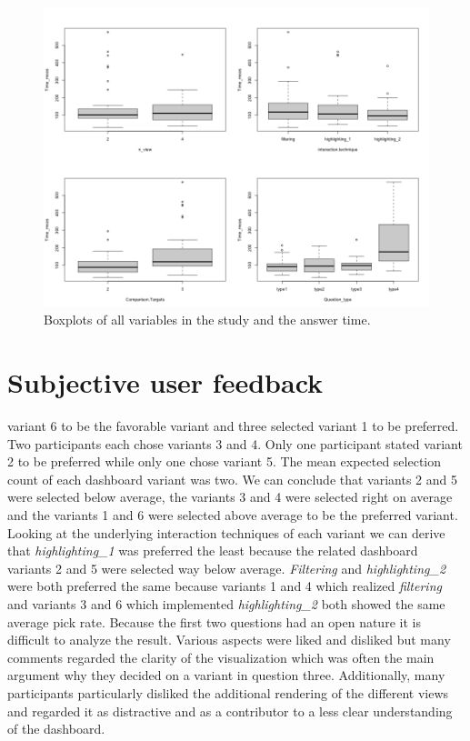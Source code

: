 \begin{figure}[ht]
    \centering
    \includegraphics[width=15.5cm]{images/boxplots.png}
    \caption{Boxplots of all variables in the study and the answer time.} \label{boxplotsStudyVariablesAnswerTimefigure}
\end{figure}

\section{Subjective user feedback}
variant 6 to be the favorable variant and three selected variant 1 to be preferred. Two participants each chose variants 3 and 4. Only one participant
stated variant 2 to be preferred while only one chose variant 5. The mean expected selection count of each dashboard variant was two. We can conclude that
variants 2 and 5 were selected below average, the variants 3 and 4 were selected right on average and the variants 1 and 6 were selected above average to be
the preferred variant. Looking at the underlying interaction techniques of each variant we can derive that \textit{highlighting\_1} was preferred the least
because the related dashboard variants 2 and 5 were selected way below average. \textit{Filtering} and \textit{highlighting\_2} were both preferred the same
because variants 1 and 4 which realized \textit{filtering} and variants 3 and 6 which implemented \textit{highlighting\_2} both showed the same average pick rate.
Because the first two questions had an open nature it is difficult to analyze the result. Various aspects were liked and disliked but many comments
regarded the clarity of the visualization which was often the main argument why they decided on a variant in question three. Additionally, many participants
particularly disliked the additional rendering of the different views and regarded it as distractive and as a contributor to a less clear understanding of
the dashboard.